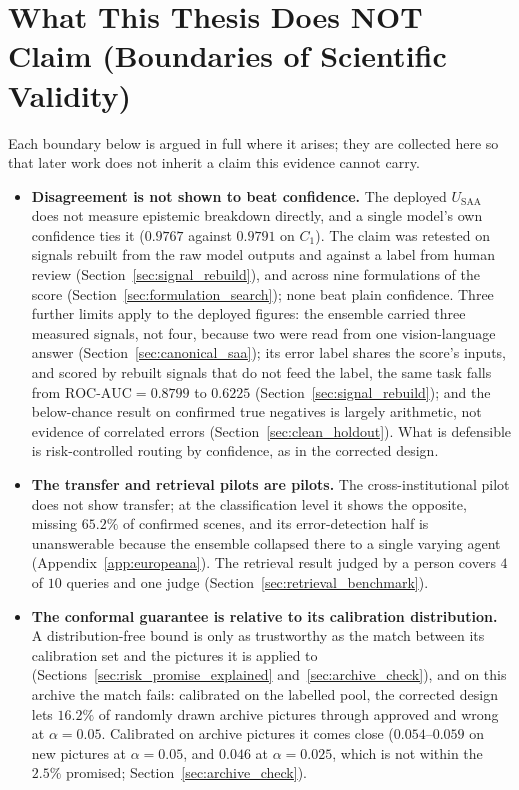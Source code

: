\documentclass[12pt,a4paper]{report}
\begin{document}
\section{What This Thesis Does NOT Claim (Boundaries of Scientific Validity)}
\label{sec:not_claim}
Each boundary below is argued in full where it arises; they are collected here so that later work does not inherit a claim this evidence cannot carry.
\begin{itemize}
    \item \textbf{Disagreement is not shown to beat confidence.} The deployed $U_{\text{SAA}}$ does not measure epistemic breakdown directly, and a single model's own confidence ties it ($0.9767$ against $0.9791$ on $C_1$). The claim was retested on signals rebuilt from the raw model outputs and against a label from human review (Section~\ref{sec:signal_rebuild}), and across nine formulations of the score (Section~\ref{sec:formulation_search}); none beat plain confidence. Three further limits apply to the deployed figures: the ensemble carried three measured signals, not four, because two were read from one vision-language answer (Section~\ref{sec:canonical_saa}); its error label shares the score's inputs, and scored by rebuilt signals that do not feed the label, the same task falls from $\text{ROC-AUC}=0.8799$ to $0.6225$ (Section~\ref{sec:signal_rebuild}); and the below-chance result on confirmed true negatives is largely arithmetic, not evidence of correlated errors (Section~\ref{sec:clean_holdout}). What is defensible is risk-controlled routing by confidence, as in the corrected design.
    \item \textbf{The transfer and retrieval pilots are pilots.} The cross-institutional pilot does not show transfer; at the classification level it shows the opposite, missing $65.2\%$ of confirmed scenes, and its error-detection half is unanswerable because the ensemble collapsed there to a single varying agent (Appendix~\ref{app:europeana}). The retrieval result judged by a person covers $4$ of $10$ queries and one judge (Section~\ref{sec:retrieval_benchmark}).
    \item \textbf{The conformal guarantee is relative to its calibration distribution.} A distribution-free bound is only as trustworthy as the match between its calibration set and the pictures it is applied to (Sections~\ref{sec:risk_promise_explained} and~\ref{sec:archive_check}), and on this archive the match fails: calibrated on the labelled pool, the corrected design lets $16.2\%$ of randomly drawn archive pictures through approved and wrong at $\alpha=0.05$. Calibrated on archive pictures it comes close ($0.054$--$0.059$ on new pictures at $\alpha=0.05$, and $0.046$ at $\alpha=0.025$, which is not within the $2.5\%$ promised; Section~\ref{sec:archive_check}).

\end{itemize}
\end{document}
